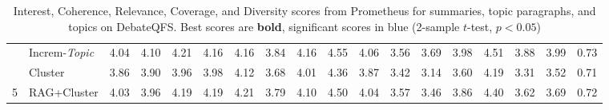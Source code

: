 \begin{table*}[]
\begin{tabular}{@{}clrrrrrrrrrrrrrrrc@{}}
 & \multicolumn{1}{l|}{Increm-\textit{Topic}} & \cellcolor[HTML]{DAE8FC}4.04 & \cellcolor[HTML]{DAE8FC}4.10 & \cellcolor[HTML]{DAE8FC}4.21 & \cellcolor[HTML]{DAE8FC}4.16 & \multicolumn{1}{r|}{\cellcolor[HTML]{DAE8FC}4.16} & 3.84 & 4.16 & \cellcolor[HTML]{DAE8FC}4.55 & 4.06 & \multicolumn{1}{r|}{3.56} & 3.69 & 3.98 & 4.51 & 3.88 & \multicolumn{1}{r|}{3.99} & 0.73 \\
 & \multicolumn{1}{l|}{Cluster} & 3.86 & 3.90 & 3.96 & 3.98 & \multicolumn{1}{r|}{4.12} & 3.68 & 4.01 & 4.36 & 3.87 & \multicolumn{1}{r|}{3.42} & 3.14 & 3.60 & 4.19 & 3.31 & \multicolumn{1}{r|}{3.52} & 0.71 \\
\multirow{-10}{*}{5} & \multicolumn{1}{l|}{RAG+Cluster} & \cellcolor[HTML]{DAE8FC}4.03 & \cellcolor[HTML]{DAE8FC}3.96 & \cellcolor[HTML]{DAE8FC}4.19 & \cellcolor[HTML]{DAE8FC}4.19 & \multicolumn{1}{r|}{\cellcolor[HTML]{DAE8FC}4.21} & 3.79 & 4.10 & 4.50 & 4.04 & \multicolumn{1}{r|}{3.57} & 3.46 & 3.86 & 4.40 & 3.62 & \multicolumn{1}{r|}{3.69} & 0.72 \\ \bottomrule
\end{tabular}
\caption{\label{appendix:table:llm_debate} Interest, Coherence, Relevance, Coverage, and Diversity scores from Prometheus for summaries, topic paragraphs, and topics on DebateQFS. Best scores are \textbf{bold}, significant scores in \colorbox{myblue}{blue} (2-sample $t$-test, $p<0.05$)}
\end{table*}